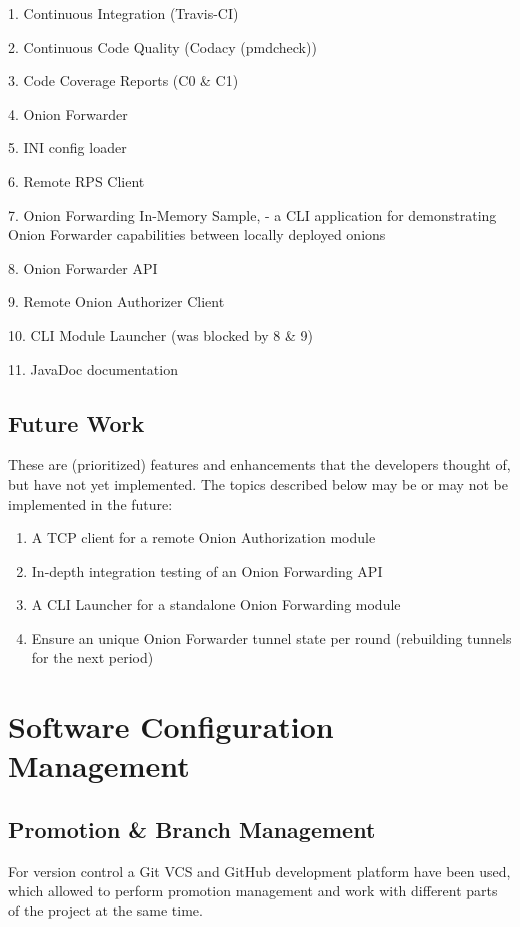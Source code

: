 \documentclass{article}
\newcommand{\cmark}{\ding{51}}%
\newcommand{\xmark}{\ding{55}}%
\newcommand{\done}{\rlap{$\square$}{\raisebox{2pt}{\large\hspace{1pt}\cmark}}%
\hspace{-2.5pt}}
\newcommand{\wontfix}{\rlap{$\square$}{\large\hspace{1pt}\xmark}}
\begin{document}
\begin{todolist}
  \item[\done] 1. Continuous Integration (Travis-CI)
  \item[\done] 2. Continuous Code Quality (Codacy (pmdcheck))
  \item[\done] 3. Code Coverage Reports (C0 \& C1)
  \item[\done] 4. Onion Forwarder
  \item[\done] 5. INI config loader
  \item[\done] 6. Remote RPS Client
  \item[\done] 7. Onion Forwarding In-Memory Sample, - a CLI application for demonstrating Onion Forwarder capabilities between locally deployed onions
  \item[\done] 8. Onion Forwarder API
  \item[\wontfix] 9. Remote Onion Authorizer Client
  \item[\wontfix] 10. CLI Module Launcher (was blocked by 8 \& 9)
  \item[\done] 11. JavaDoc documentation
\end{todolist}

\subsection{Future Work}
These are (prioritized) features and enhancements that the developers thought of, but have not yet implemented. The topics described below may be or may not be implemented in the future:
\begin{enumerate}
  \item A TCP client for a remote Onion Authorization module
  \item In-depth integration testing of an Onion Forwarding API
  \item A CLI Launcher for a standalone Onion Forwarding module
  \item Ensure an unique Onion Forwarder tunnel state per round (rebuilding tunnels for the next period)
\end{enumerate}

\section{Software Configuration Management}
\subsection{Promotion \& Branch Management}
For version control a Git VCS and GitHub development platform have been used, which allowed to perform promotion management and work with different parts of the project at the same time.
\end{document}
